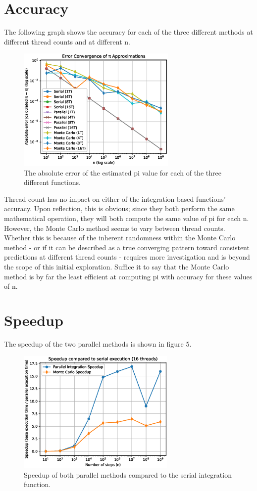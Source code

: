 \documentclass[a4paper]{article}
\begin{document}
\section{Accuracy}
The following graph shows the accuracy for each of the three different methods at different thread counts and at different n.
\begin{figure}[ht]
\begin{center}
\includegraphics[height=6cm]{errs.eps}
\caption{The absolute error of the estimated pi value for each of the three different functions.}
\label{fig4}
\end{center}
\end{figure}
Thread count has no impact on either of the integration-based functions' accuracy. Upon reflection, this is obvious; since they both perform the same mathematical operation, they will both compute the same value of pi for each n. However, the Monte Carlo method seems to vary between thread counts. Whether this is because of the inherent randomness within the Monte Carlo method - or if it can be described as a true converging pattern toward consistent predictions at different thread counts - requires more investigation and is beyond the scope of this initial exploration. Suffice it to say that the Monte Carlo method is by far the least efficient at computing pi with accuracy for these values of n. 

\section{Speedup}
The speedup of the two parallel methods is shown in figure 5.
\begin{figure}[ht]
\begin{center}
\includegraphics[height=6cm]{speedup.eps}
\caption{Speedup of both parallel methods compared to the serial integration function.}
\label{fig5}
\end{center}
\end{figure}
\end{document}
